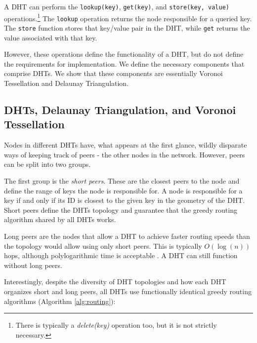 A DHT can perform the \texttt{lookup(key)}, \texttt{get(key)}, and \texttt{store(key, value)} operations.\footnote{There is typically a \textit{delete(key)} operation too, but it is not strictly necessary.}
The \texttt{lookup} operation returns the node responsible for a queried key.
The \texttt{store} function stores that key/value pair in the DHT, while \texttt{get} returns the value associated with that key.

However, these operations define the functionality of a DHT, but do not define the requirements for implementation.
We define the necessary components that comprise DHTs.
We show that these components are essentially Voronoi Tessellation and Delaunay Triangulation.

\subsection{DHTs, Delaunay Triangulation, and Voronoi Tessellation}

Nodes in different DHTs have, what appears at the first glance, wildly disparate ways of keeping track of peers - the other nodes in the network.
However, peers can be split into two groups.

The first group is the \textit{short peers}.
These are the closest peers to the node and define the range of keys the node is responsible for. 
A node is responsible for a key if and only if its ID is closest to the given key in the geometry of the DHT.
Short peers define the DHTs topology and guarantee that the greedy routing algorithm shared by all DHTs works.


Long peers are the nodes that allow a DHT to achieve faster routing speeds than the topology would allow using only short peers.
This is typically $ O(\log(n)) $ hops, although polylogarithmic time is acceptable \cite{kleinberg2000navigation}.
A DHT can still function without long peers.

Interestingly, despite the diversity of DHT topologies and how each DHT organizes short and long peers,  all DHTs use functionally identical greedy routing algorithms (Algorithm \ref{alg:routing}):


